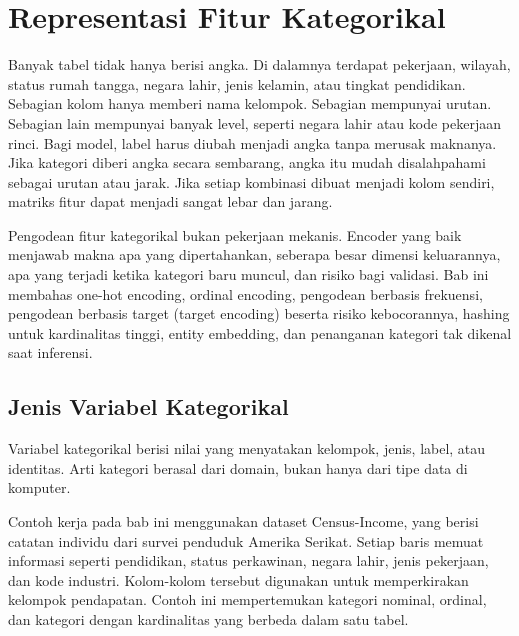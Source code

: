 \chapter{Representasi Fitur Kategorikal}\label{representasi-fitur-kategorikal}

Banyak tabel tidak hanya berisi angka. Di dalamnya terdapat pekerjaan, wilayah, status rumah tangga, negara lahir, jenis kelamin, atau tingkat pendidikan. Sebagian kolom hanya memberi nama kelompok. Sebagian mempunyai urutan. Sebagian lain mempunyai banyak level, seperti negara lahir atau kode pekerjaan rinci. Bagi model, label harus diubah menjadi angka tanpa merusak maknanya. Jika kategori diberi angka secara sembarang, angka itu mudah disalahpahami sebagai urutan atau jarak. Jika setiap kombinasi dibuat menjadi kolom sendiri, matriks fitur dapat menjadi sangat lebar dan jarang.

Pengodean fitur kategorikal bukan pekerjaan mekanis. Encoder yang baik menjawab makna apa yang dipertahankan, seberapa besar dimensi keluarannya, apa yang terjadi ketika kategori baru muncul, dan risiko bagi validasi. Bab ini membahas one-hot encoding, ordinal encoding, pengodean berbasis frekuensi, pengodean berbasis target (target encoding) beserta risiko kebocorannya, hashing untuk kardinalitas tinggi, entity embedding, dan penanganan kategori tak dikenal saat inferensi.

\section{Jenis Variabel Kategorikal}\label{jenis-variabel-kategorikal}

Variabel kategorikal berisi nilai yang menyatakan kelompok, jenis, label, atau identitas. Arti kategori berasal dari domain, bukan hanya dari tipe data di komputer.

Contoh kerja pada bab ini menggunakan dataset Census-Income, yang berisi catatan individu dari survei penduduk Amerika Serikat. Setiap baris memuat informasi seperti pendidikan, status perkawinan, negara lahir, jenis pekerjaan, dan kode industri. Kolom-kolom tersebut digunakan untuk memperkirakan kelompok pendapatan. Contoh ini mempertemukan kategori nominal, ordinal, dan kategori dengan kardinalitas yang berbeda dalam satu tabel.

